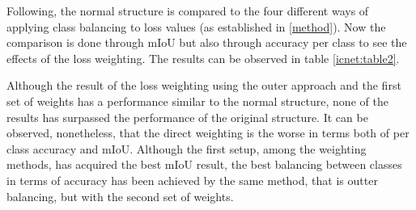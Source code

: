 Following, the normal structure is compared to the four different ways of applying class balancing to loss values (as established in \ref{method}). Now the comparison is done through mIoU but also through accuracy per class to see the effects of the loss weighting. The results can be observed in table \ref{icnet:table2}.\newline

\begin{table}[h!]
  \begin{center}
    \caption{Performance results on validation dataset for the normal structure and the architecture with loss weighting for each setup. Here W1 indicates the inverse frequency weithing and W2 the exponential weighting. Best values enclosed in [].}
    \label{icnet:table2}
  \end{center}
\end{table}

Although the  result of the loss weighting using the outer approach and the first set of weights has a performance similar to the normal structure, none of the results has surpassed the performance of the original structure. It can be observed, nonetheless, that the direct weighting is the worse in terms both of per class accuracy and mIoU. Although the first setup, among the weighting methods, has acquired the best mIoU result, the best balancing between classes in terms of accuracy has been achieved by the same method, that is outter balancing, but with the second set of weights.\newline


